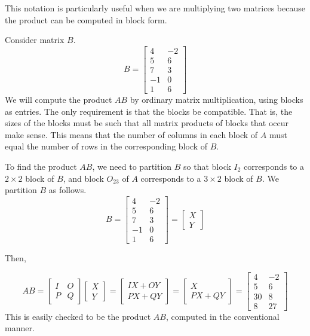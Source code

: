\documentclass{ximera}
\begin{document}
This notation is particularly useful when we are multiplying two matrices because the product can be computed in block form.

Consider matrix $B$.
\begin{equation*}
B = \left[ \begin{array}{rr}
4 & -2 \\
5 & 6 \\
7 & 3 \\
-1 & 0 \\
1 & 6
\end{array} \right]
\end{equation*}
We will compute the product $AB$ by ordinary matrix multiplication, using blocks as entries. The only requirement is that the blocks be compatible. That is, the sizes of the blocks must be such that all matrix products of blocks that occur make sense. This means that the number of columns in each block of $A$ must equal the number of rows in the corresponding block of $B$.

To find the product $AB$, we need to partition $B$ so that block $I_2$ corresponds to a $2\times 2$ block of $B$, and block $O_{23}$ of $A$ corresponds to a $3\times 2$ block of $B$.  We partition $B$ as follows.
\begin{equation*}
B = \left[ \begin{array}{rr}
4 & -2 \\
5 & 6 \\
\hline
7 & 3 \\
-1 & 0 \\
1 & 6
\end{array} \right] = \left[ \begin{array}{c}
X \\
Y
\end{array} \right]
\end{equation*}

Then,

\begin{equation*}
AB = \left[ \begin{array}{cc}
I & O \\
P & Q
\end{array} \right] \left[ \begin{array}{c}
X \\
Y
\end{array} \right] = \left[ \begin{array}{c}
IX + OY \\
PX + QY
\end{array} \right] = \left[ \begin{array}{c}
X \\
PX + QY
\end{array} \right] = \left[ \begin{array}{rr}
4 & -2 \\
5 & 6 \\
\hline
30 & 8 \\
8 & 27
\end{array} \right]
\end{equation*}
This is easily checked to be the product $AB$, computed in the conventional manner.
\end{document}
